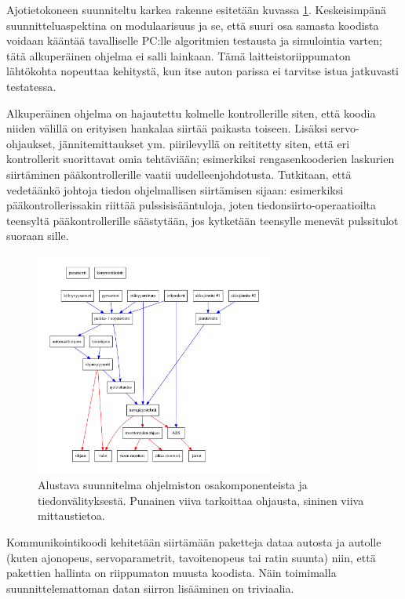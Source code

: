 \documentclass{article}
\begin{document}
Ajotietokoneen suunniteltu karkea rakenne esitetään kuvassa \ref{fig:software}. Keskeisimpänä suunnitteluaspektina on modulaarisuus ja se, että suuri osa samasta koodista voidaan kääntää tavalliselle PC:lle algoritmien testausta ja simulointia varten; tätä alkuperäinen ohjelma ei salli lainkaan. Tämä laitteistoriippumaton lähtökohta nopeuttaa kehitystä, kun itse auton parissa ei tarvitse istua jatkuvasti testatessa.

Alkuperäinen ohjelma on hajautettu kolmelle kontrollerille siten, että koodia niiden välillä on erityisen hankalaa siirtää paikasta toiseen. Lisäksi servo-ohjaukset, jännitemittaukset ym. piirilevyllä on reititetty siten, että eri kontrollerit suorittavat omia tehtäviään; esimerkiksi rengasenkooderien laskurien siirtäminen pääkontrollerille vaatii uudelleenjohdotusta. Tutkitaan, että vedetäänkö johtoja tiedon ohjelmallisen siirtämisen sijaan: esimerkiksi pääkontrollerissakin riittää pulssisisääntuloja, joten tiedonsiirto-operaatioilta teensyltä pääkontrollerille säästytään, jos kytketään teensylle menevät pulssitulot suoraan sille.

\begin{figure}[H]
\centering
\includegraphics[width=0.7\textwidth]{images/software}
\caption{Alustava suunnitelma ohjelmiston osakomponenteista ja tiedonvälityksestä. Punainen viiva tarkoittaa ohjausta, sininen viiva mittaustietoa.}
\label{fig:software}
\end{figure}

Kommunikointikoodi kehitetään siirtämään paketteja dataa autosta ja autolle (kuten ajonopeus, servoparametrit, tavoitenopeus tai ratin suunta) niin, että pakettien hallinta on riippumaton muusta koodista. Näin toimimalla suunnittelemattoman datan siirron lisääminen on triviaalia.
\end{document}
